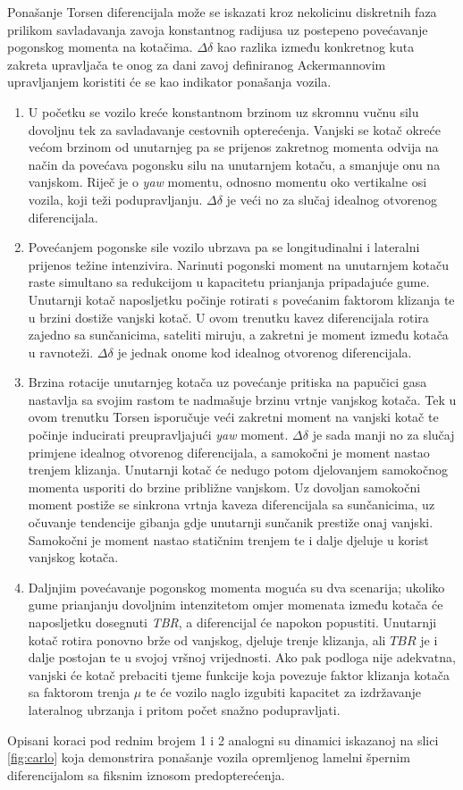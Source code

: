 \documentclass[11pt]{article}
\numberwithin{equation}{section}%
\begin{document}
Ponašanje Torsen diferencijala može se iskazati kroz nekolicinu diskretnih faza prilikom savladavanja zavoja konstantnog radijusa uz postepeno povećavanje pogonskog momenta na kotačima. $\Delta \delta$ kao razlika između konkretnog kuta zakreta upravljača te onog za dani zavoj definiranog Ackermannovim upravljanjem koristiti će se kao indikator ponašanja vozila.

\begin{enumerate}
\item U početku se vozilo kreće konstantnom brzinom uz skromnu vučnu silu dovoljnu tek za savladavanje cestovnih opterećenja. Vanjski se kotač okreće većom brzinom od unutarnjeg pa se prijenos zakretnog momenta odvija na način da povećava pogonsku silu na unutarnjem kotaču, a smanjuje onu na vanjskom. Riječ je o \textit{yaw} momentu, odnosno momentu oko vertikalne osi vozila, koji teži podupravljanju. $\Delta \delta$ je veći no za slučaj idealnog otvorenog diferencijala.
\item Povećanjem pogonske sile vozilo ubrzava pa se longitudinalni i lateralni prijenos težine intenzivira. Narinuti pogonski moment na unutarnjem kotaču raste simultano sa redukcijom u kapacitetu prianjanja pripadajuće gume. Unutarnji kotač naposljetku počinje rotirati s povećanim faktorom klizanja te u brzini dostiže vanjski kotač. U ovom trenutku kavez diferencijala rotira zajedno sa sunčanicima, sateliti miruju, a zakretni je moment između kotača u ravnoteži. $\Delta \delta$ je jednak onome kod idealnog otvorenog diferencijala.
\item Brzina rotacije unutarnjeg kotača uz povećanje pritiska na papučici gasa nastavlja sa svojim rastom te nadmašuje brzinu vrtnje vanjskog kotača. Tek u ovom trenutku Torsen isporučuje veći zakretni moment na vanjski kotač te počinje inducirati preupravljajući \textit{yaw} moment. $\Delta \delta$ je sada manji no za slučaj primjene idealnog otvorenog diferencijala, a samokočni je moment nastao trenjem klizanja. Unutarnji kotač će nedugo potom djelovanjem samokočnog momenta usporiti do brzine približne vanjskom. Uz dovoljan samokočni moment postiže se sinkrona vrtnja kaveza diferencijala sa sunčanicima, uz očuvanje tendencije gibanja gdje unutarnji sunčanik prestiže onaj vanjski. Samokočni je moment nastao statičnim trenjem te i dalje djeluje u korist vanjskog kotača.
\item Daljnjim povećavanje pogonskog momenta moguća su dva scenarija; ukoliko gume prianjanju dovoljnim intenzitetom omjer momenata između kotača će naposljetku dosegnuti \textit{TBR}, a diferencijal će napokon popustiti. Unutarnji kotač rotira ponovno brže od vanjskog, djeluje trenje klizanja, ali $TBR$ je i dalje postojan te u svojoj vršnoj vrijednosti. Ako pak podloga nije adekvatna, vanjski će kotač prebaciti tjeme funkcije koja povezuje faktor klizanja kotača sa faktorom trenja $\mu$ te će vozilo naglo izgubiti kapacitet za izdržavanje lateralnog ubrzanja i pritom počet snažno podupravljati.
\end{enumerate}
%
Opisani koraci pod rednim brojem 1 i 2 analogni su dinamici iskazanoj na slici \ref{fig:carlo} koja demonstrira ponašanje vozila opremljenog lamelni špernim diferencijalom sa fiksnim iznosom predopterećenja.
\end{document}
